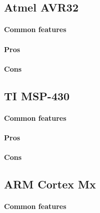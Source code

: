 \documentclass[a4paper,10pt]{article}
\begin{document}
\begin{multicols}{2}
\subsection{Atmel AVR32}

\TODO


\paragraph{Common features}
\TODO


\paragraph{Pros}
\TODO


\paragraph{Cons}
\TODO


\subsection{TI MSP-430}

\TODO


\paragraph{Common features}
\TODO


\paragraph{Pros}
\TODO


\paragraph{Cons}
\TODO


\subsection{ARM Cortex Mx}

\TODO


\paragraph{Common features}
\TODO



\end{multicols}
\end{document}
